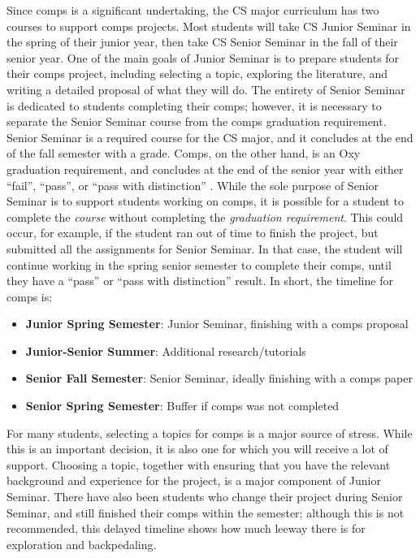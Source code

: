 \documentclass[10pt,twocolumn]{article}
\begin{document}
Since comps is a significant undertaking, the CS major curriculum has two courses to support comps projects.
Most students will take CS Junior Seminar in the spring of their junior year, then take CS Senior Seminar in the fall of their senior year.
One of the main goals of Junior Seminar is to prepare students for their comps project, including selecting a topic, exploring the literature, and writing a detailed proposal of what they will do.
The entirety of Senior Seminar is dedicated to students completing their comps; however, it is necessary to separate the Senior Seminar course from the comps graduation requirement.
Senior Seminar is a required course for the CS major, and it concludes at the end of the fall semester with a grade.
Comps, on the other hand, is an Oxy graduation requirement, and concludes at the end of the senior year with either ``fail'', ``pass'', or ``pass with distinction'' \cite{Occidental2022Comps}.
While the sole purpose of Senior Seminar is to support students working on comps, it is possible for a student to complete the \textit{course} without completing the \textit{graduation requirement}.
This could occur, for example, if the student ran out of time to finish the project, but submitted all the assignments for Senior Seminar.
In that case, the student will continue working in the spring senior semester to complete their comps, until they have a ``pass'' or ``pass with distinction'' result.
In short, the timeline for comps is:

\begin{itemize}
    \item \textbf{Junior Spring Semester}: Junior Seminar, finishing with a comps proposal
    \item \textbf{Junior-Senior Summer}: Additional research/tutorials
    \item \textbf{Senior Fall Semester}: Senior Seminar, ideally finishing with a comps paper
    \item \textbf{Senior Spring Semester}: Buffer if comps was not completed
\end{itemize}

For many students, selecting a topics for comps is a major source of stress.
While this is an important decision, it is also one for which you will receive a lot of support.
Choosing a topic, together with ensuring that you have the relevant background and experience for the project, is a major component of Junior Seminar.
There have also been students who change their project during Senior Seminar, and still finished their comps within the semester; although this is not recommended, this delayed timeline shows how much leeway there is for exploration and backpedaling.
\end{document}

